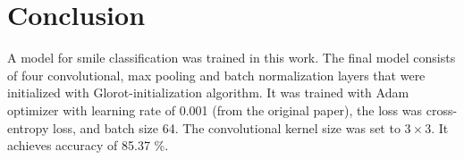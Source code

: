 \documentclass{article}
\begin{document}
\section{Conclusion}\label{sec:conclusion}
A model for smile classification was trained in this work. The final
model consists of four convolutional, max pooling and batch
normalization layers that were initialized with Glorot-initialization
algorithm. It was trained with Adam optimizer with learning rate of
0.001 (from the original paper), the loss was cross-entropy loss, and
batch size 64. The convolutional kernel size was set to $3 \times 3$.
It achieves accuracy of 85.37 \%.

\small




%

\vfill\pagebreak
\end{document}
